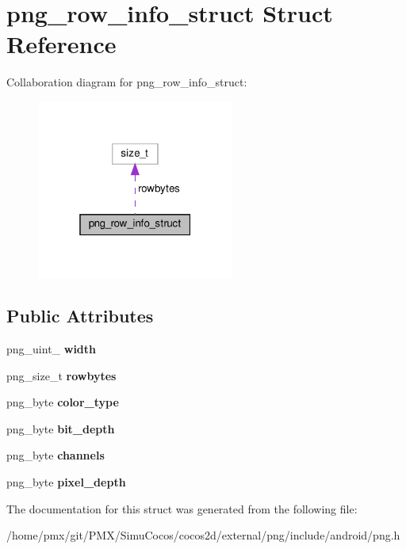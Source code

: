 \hypertarget{structpng__row__info__struct}{}\section{png\+\_\+row\+\_\+info\+\_\+struct Struct Reference}
\label{structpng__row__info__struct}


Collaboration diagram for png\+\_\+row\+\_\+info\+\_\+struct\+:
\nopagebreak
\begin{figure}[H]
\begin{center}
\leavevmode
\includegraphics[width=184pt]{structpng__row__info__struct__coll__graph}
\end{center}
\end{figure}
\subsection*{Public Attributes}
\begin{DoxyCompactItemize}
\item 
\mbox{\label{structpng__row__info__struct_a1ab107da5ffee8100eeaa76cc5ba3e62}} 
png\+\_\+uint\+\_ {\bfseries width}
\item 
\mbox{\label{structpng__row__info__struct_a924a208653f2577c05db5e1cf3aa5817}} 
png\+\_\+size\+\_\+t {\bfseries rowbytes}
\item 
\mbox{\label{structpng__row__info__struct_a646244422549c66e6661cfcdb67c8e28}} 
png\+\_\+byte {\bfseries color\+\_\+type}
\item 
\mbox{\label{structpng__row__info__struct_a6b14d5d0cc32f151c28c568cf1c1f82d}} 
png\+\_\+byte {\bfseries bit\+\_\+depth}
\item 
\mbox{\label{structpng__row__info__struct_a7cefee70361a3789a862001aefcd872f}} 
png\+\_\+byte {\bfseries channels}
\item 
\mbox{\label{structpng__row__info__struct_a70b84917ef9eabc9b7d29ec96fd01153}} 
png\+\_\+byte {\bfseries pixel\+\_\+depth}
\end{DoxyCompactItemize}


The documentation for this struct was generated from the following file\+:\begin{DoxyCompactItemize}
\item 
/home/pmx/git/\+P\+M\+X/\+Simu\+Cocos/cocos2d/external/png/include/android/png.\+h\end{DoxyCompactItemize}
